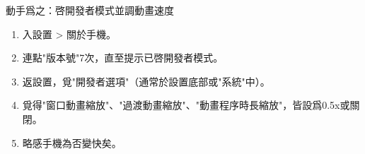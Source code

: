 \begin{tcbpractice}{動手爲之：啓開發者模式並調動畫速度}
\begin{enumerate}
  \item 入設置 > 關於手機。
  \item 連點"版本號"7次，直至提示已啓開發者模式。
  \item 返設置，覓"開發者選項"（通常於設置底部或"系統"中）。
  \item 覓得"窗口動畫縮放"、"過渡動畫縮放"、"動畫程序時長縮放"，皆設爲0.5x或關閉。
  \item 略感手機為否變快矣。
\end{enumerate}

\end{tcbpractice}
